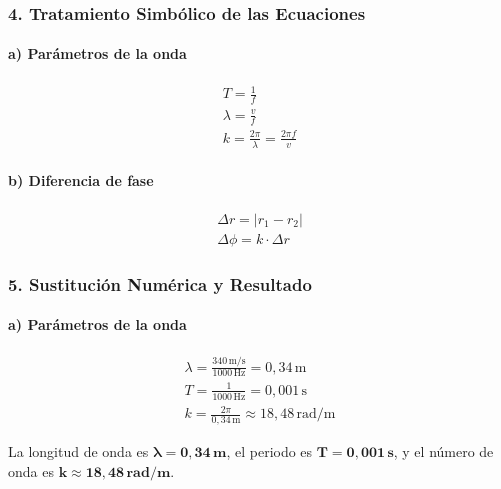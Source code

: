 \subsubsection*{4. Tratamiento Simbólico de las Ecuaciones}
\paragraph*{a) Parámetros de la onda}
\begin{gather}
    T = \frac{1}{f} \\
    \lambda = \frac{v}{f} \\
    k = \frac{2\pi}{\lambda} = \frac{2\pi f}{v}
\end{gather}
\paragraph*{b) Diferencia de fase}
\begin{gather}
    \Delta r = |r_1 - r_2| \\
    \Delta\phi = k \cdot \Delta r
\end{gather}

\subsubsection*{5. Sustitución Numérica y Resultado}
\paragraph*{a) Parámetros de la onda}
\begin{gather}
    \lambda = \frac{340 \, \text{m/s}}{1000 \, \text{Hz}} = 0,34 \, \text{m} \\
    T = \frac{1}{1000 \, \text{Hz}} = 0,001 \, \text{s} \\
    k = \frac{2\pi}{0,34 \, \text{m}} \approx 18,48 \, \text{rad/m}
\end{gather}
\begin{cajaresultado}
    La longitud de onda es $\boldsymbol{\lambda = 0,34 \, \textbf{m}}$, el periodo es $\boldsymbol{T = 0,001 \, \textbf{s}}$, y el número de onda es $\boldsymbol{k \approx 18,48 \, \textbf{rad/m}}$.
\end{cajaresultado}

